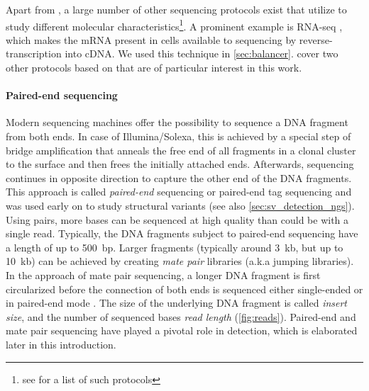 Apart from \wgs, a large number of
other sequencing protocols exist that utilize \mps to study different molecular
characteristics\footnote{see \citet{Pachter2018} for a list of such protocols}.
A prominent example is RNA-seq \citep{Morin2008,Wang2009},
which makes the mRNA present in cells available to sequencing by
reverse-transcription into cDNA. We used this technique in \cref{sec:balancer}.
 cover two other protocols based on \mps that are
of particular interest in this work.

\paragraph{Paired-end sequencing}


Modern sequencing machines offer the possibility to sequence a DNA fragment
from both ends. In case of Illumina/Solexa, this is achieved by a special step
of bridge amplification that anneals the free end of all fragments in a clonal
cluster to the surface and then frees the initially attached ends. Afterwards,
sequencing continues in opposite direction to capture the other end of the
DNA fragments. This approach is called \emph{paired-end} sequencing or
paired-end tag sequencing and was used early on to study structural variants
\citep{Campbell2008} (see also \cref{sec:sv_detection_ngs}). Using pairs, more
bases can be sequenced at high quality than could be with a single read.
Typically, the DNA fragments subject to paired-end sequencing have a length of
up to 500~bp. Larger fragments (typically around 3~kb, but up to 10~kb) can be
achieved by creating \emph{mate pair} libraries (a.k.a jumping libraries). In the
approach of mate pair sequencing, a longer DNA fragment is first circularized before
the connection of both ends is sequenced either single-ended or in paired-end mode
\citep{Korbel2007}. The size of the underlying DNA fragment is called
\emph{insert size}, and the number of sequenced bases \emph{read length}
(\cref{fig:reads}). Paired-end and mate pair sequencing have played a pivotal
role in \sv detection, which is elaborated later in this introduction.

